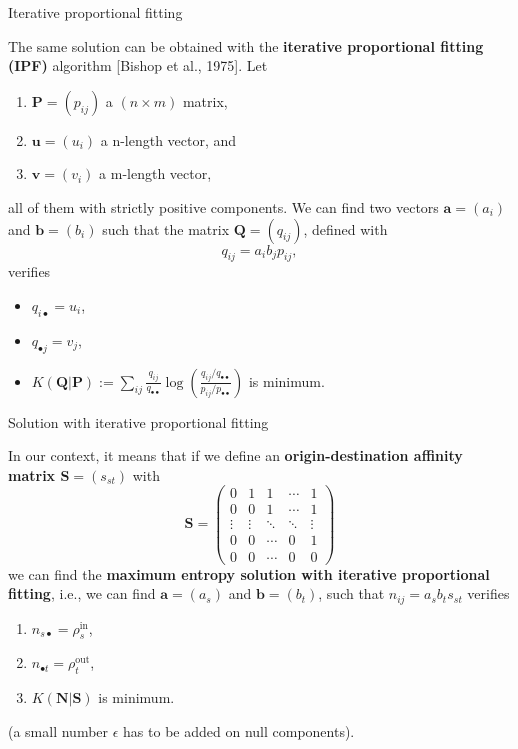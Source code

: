 \documentclass[10pt]{beamer}
\newcommand{\imp}[1]{\textbf{\color{cyan}#1}}
\begin{document}
	
	\begin{frame}{Iterative proportional fitting}
	
	The same solution can be obtained with the \imp{iterative proportional fitting (IPF)} algorithm [Bishop et al., 1975]. Let 
	\begin{enumerate}
		\item $\mathbf{P} = (p_{ij})$ a $(n \times m)$ matrix, 
		\item $\mathbf{u} = (u_i)$ a n-length vector, and 
		\item $\mathbf{v} = (v_i)$ a m-length vector,
	\end{enumerate}
	all of them with strictly positive components. We can find two vectors $\mathbf{a} = (a_i)$ and $\mathbf{b} = (b_i)$ such that the matrix $\mathbf{Q} = (q_{ij})$, defined with
	$$
		q_{ij} = a_i b_j p_{ij},
	$$
	verifies
	\begin{itemize}
		\item $q_{i\bullet} = u_i$,
		\item $q_{\bullet j} = v_j$,
		\item $K(\mathbf{Q}| \mathbf{P}) := \sum_{ij} \frac{q_{ij}}{q_{\bullet \bullet}} \log \left( \frac{q_{ij} / q_{\bullet \bullet}}{p_{ij} / p_{\bullet \bullet}} \right)$ is minimum.
	\end{itemize}
	\end{frame}
	
	
	\begin{frame}{Solution with iterative proportional fitting}
		
		In our context, it means that if we define an \imp{origin-destination affinity matrix $\mathbf{S} = (s_{st})$} with 
			$$
				\mathbf{S} = \left( \begin{array}{ccccc}
				0 & 1 & 1 & \cdots & 1 \\
				0 & 0 & 1 & \cdots & 1 \\
				\vdots & \vdots & \ddots & \ddots & \vdots \\
				0 & 0 & \cdots & 0 & 1 \\
				0 & 0 & \cdots & 0 & 0 
				\end{array} \right)
			$$
		we can find the \imp{maximum entropy solution with iterative proportional fitting}, i.e., we can find $\mathbf{a} = (a_s)$ and $\mathbf{b} = (b_t)$, such that $n_{ij} = a_s b_t s_{st}$ verifies
		\begin{enumerate}
			\item $n_{s\bullet} = \rho^\text{in}_s$,
			\item $n_{\bullet t} = \rho^\text{out}_t$,
			\item $K(\mathbf{N}| \mathbf{S})$ is minimum.
		\end{enumerate}
		\small (a small number $\epsilon$ has to be added on null components).
	\end{frame}
	
\end{document}
